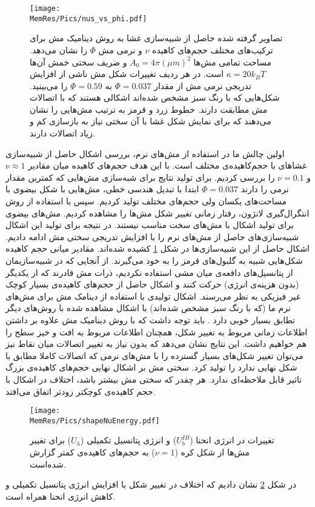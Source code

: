 \begin{figure}[htbp]
\begin{center}
\texttt{[image: \\MemRes/Pics/nus\_vs\_phi.pdf]}
\caption{
تصاویر گرفته شده حاصل از شبیه‌سازی غشا به روش دینامیک مش برای ترکیب‌های مختلف حجم‌های کاهیده‌
 $\nu$
و نرمی مش
$\Phi$
را نشان می‌دهد. مساحت تمامی‌ مش‌ها 
$A_0=4\pi (\mu m)^2$
و ضریف سختی خمش آن‌ها
$\kappa=20k_BT$
است. در هر ردیف تغییرات شکل مش ناشی از افزایش تدریجی نرمی مش از مقدار
$\Phi=0.037$
به
$\Phi=0.59$
را می‌بینید. شکل‌هایی که با رنگ سبز مشخص شده‌اند اشکالی هستند که با اتصالات مش مطابقت دارند. خطوط زرد و قرمز به ترتیب مش‌هایی را نشان می‌دهند که برای نمایش شکل غشا با آن سختی نیاز به بازسازی کم و زیاد اتصالات دارند.
}
\label{fig:nuShapes}
\end{center}
\end{figure}

اولین چالش ما در استفاده از مش‌های نرم، بررسی اشکال حاصل از شبیه‌سازی غشاهای با حجم‌کاهیده‌ی مختلف است. با این هدف حجم‌های کاهیده‌ میان مقادیر
$\nu \approx 1$
و
 $\nu = 0.1$
را بررسی کردیم. برای تولید نتایج برای شبه‌سازی مش‌هایی که کمترین مقدار نرمی را دارند
$\Phi=0.037$
ابتدا با تبدیل هندسی خطی، مش‌هایی با شکل بیضوی با مساحت‌های یکسان ولی حجم‌های مختلف تولید کردیم. سپس با استفاده از روش انتگرال‌گیری لانژون، رفتار زمانی تغییر شکل مش‌ها را مشاهده کردیم. مش‌های بیضوی برای تولید اشکال با مش‌های سخت مناسب نیستند. در نتیجه برای تولید این اشکال شبیه‌سازی‌های حاصل از مش‌های نرم را با افزایش تدریجی سختی مش ادامه دادیم. اشکال حاصل از این شبیه‌سازی‌ها در شکل
\ref{fig:nuShapes}
کشیده‌ شده‌اند. مقادیر میانی حجم کاهیده شکل‌هایی شبیه به گلبول‌های قرمز را به خود می‌گیرند. از آنجایی که در شبیه‌سازیمان از پتانسیل‌های دافعه‌ی میان مشی استفاده نکردیم، ذرات مش‌ قادرند که از یکدیگر (بدون هزینه‌ی انرژی) حرکت کنند و اشکال حاصل از حجم‌های کاهیده‌ی بسیار کوچک غیر فیزیکی به نظر می‌رسند. اشکال تولیدی با استفاده از دینامک مش برای مش‌های نرم ما (که با رنگ سبز مشخص شده‌اند) با اشکال مشاهده شده با روش‌های دیگر تطابق بسیار خوبی دارد
\cite{Peskin972JourCompPhys, Thomas1979AIAA, Chimera1986, Drabik2016, BIAN2020}
. باید توجه داشت که با روش دینامیک مش علاوه بر داشتن اطلاعات زمانی مربوط به تغییر شکل، همچنان اطلاعات مربوط به افت و خیز سطح را هم خواهیم داشت. این نتایج نشان می‌دهد که بدون نیاز به تغییر اتصالات میان نقاط نیز می‌توان تغییر شکل‌های بسیار گسترده را با مش‌های نرمی که اتصالات کاملا مطابق با شکل نهایی ندارد را تولید کرد. سختی مش بر اشکال نهایی حجم‌های کاهیده‌ی بزرگ تاثیر قابل ملاحظه‌ای ندارد. هر چقدر که سختی مش بیشتر باشد، اختلاف در اشکال با حجم کاهیده‌ی کوچکتر زودتر اتفاق می‌افتد.

\begin{figure}[htbp]
\begin{center}
\texttt{[image: \\MemRes/Pics/shapeNuEnergy.pdf]}
\caption{
تغییرات در انرژی انحنا 
($U_b^{IB}$)
و انرژی پتانسیل تکمیلی
($U_h$)
برای تغییر مش‌ها از شکل کره
($\nu=1$)
به حجم‌های کاهیده‌ی کمتر گزارش شده‌است.
}
\label{fig:UhvsNu}
\end{center}
\end{figure}


در شکل 
\ref{fig:UhvsNu}
نشان دادیم که اختلاف در تغییر شکل با افزایش انرژی پتانسیل تکمیلی و کاهش انرژی انحنا همراه است.


